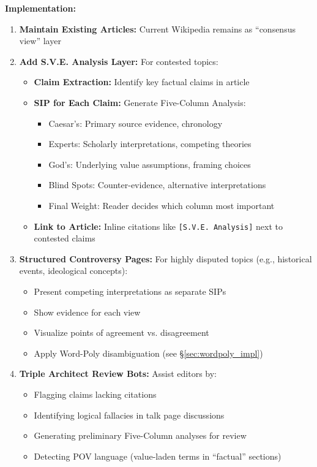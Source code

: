 \documentclass[11pt,a4paper]{article}
\theoremstyle{definition}
\theoremstyle{remark}
\newcommand{\SIP}{\textsc{SIP}}
\begin{document}
\begin{mdframed}[style=implementationbox, frametitle={Wikipedia + S.V.E. Layer}]
\textbf{Implementation:}
\begin{enumerate}
    \item \textbf{Maintain Existing Articles:} Current Wikipedia remains as ``consensus view'' layer
    
    \item \textbf{Add S.V.E. Analysis Layer:} For contested topics:
    \begin{itemize}
        \item \textbf{Claim Extraction:} Identify key factual claims in article
        \item \textbf{\SIP{} for Each Claim:} Generate Five-Column Analysis:
        \begin{itemize}
            \item Caesar's: Primary source evidence, chronology
            \item Experts: Scholarly interpretations, competing theories
            \item God's: Underlying value assumptions, framing choices
            \item Blind Spots: Counter-evidence, alternative interpretations
            \item Final Weight: Reader decides which column most important
        \end{itemize}
        \item \textbf{Link to Article:} Inline citations like \texttt{[S.V.E. Analysis]} next to contested claims
    \end{itemize}
    
    \item \textbf{Structured Controversy Pages:} For highly disputed topics (e.g., historical events, ideological concepts):
    \begin{itemize}
        \item Present competing interpretations as separate \SIP{}s
        \item Show evidence for each view
        \item Visualize points of agreement vs. disagreement
        \item Apply Word-Poly disambiguation (see \S\ref{sec:wordpoly_impl})
    \end{itemize}
    
    \item \textbf{Triple Architect Review Bots:} Assist editors by:
    \begin{itemize}
        \item Flagging claims lacking citations
        \item Identifying logical fallacies in talk page discussions
        \item Generating preliminary Five-Column analyses for review
        \item Detecting POV language (value-laden terms in ``factual'' sections)
    \end{itemize}
\end{enumerate}
\end{mdframed}
\end{document}
